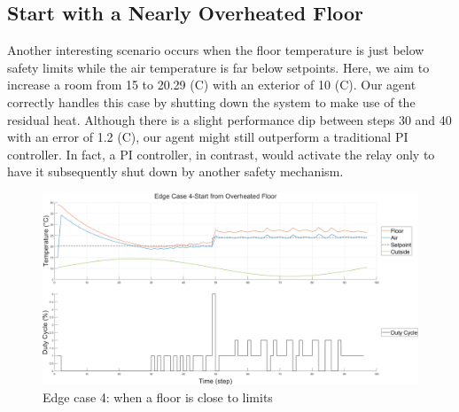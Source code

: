 \documentclass[../main.tex]{subfiles}
\begin{document}
\subsection{Start with a Nearly Overheated Floor}
Another interesting scenario occurs when the floor temperature is just below safety limits while the air temperature is far below setpoints. Here, we aim to increase a room from 15 to 20.29 (\degree C) with an exterior of 10 (\degree C). Our agent correctly handles this case by shutting down the system to make use of the residual heat. Although there is a slight performance dip between steps 30 and 40 with an error of 1.2 (\degree C), our agent might still outperform a traditional PI controller. In fact, a PI controller, in contrast, would activate the relay only to have it subsequently shut down by another safety mechanism.
\begin{figure}[htbp]
    \centering
    \includegraphics[width=1\linewidth]{figures/EdgeCase4-StartfromOverheatedFloor.png}
    \caption{Edge case 4: when a floor is close to limits}
    \label{fig:edge_4}
\end{figure}
\end{document}

